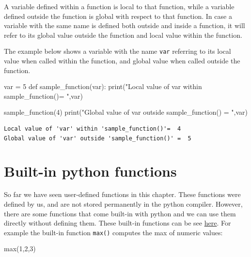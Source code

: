 \documentclass[
  letterpaper,
  DIV=11,
  numbers=noendperiod]{scrreprt}
\newenvironment{Shaded}{\begin{snugshade}}{\end{snugshade}}
\newcommand{\BuiltInTok}[1]{\textcolor[rgb]{0.00,0.23,0.31}{#1}}
\newcommand{\DecValTok}[1]{\textcolor[rgb]{0.68,0.00,0.00}{#1}}
\newcommand{\KeywordTok}[1]{\textcolor[rgb]{0.00,0.23,0.31}{#1}}
\newcommand{\NormalTok}[1]{\textcolor[rgb]{0.00,0.23,0.31}{#1}}
\newcommand{\OperatorTok}[1]{\textcolor[rgb]{0.37,0.37,0.37}{#1}}
\newcommand{\StringTok}[1]{\textcolor[rgb]{0.13,0.47,0.30}{#1}}
\begin{document}
A variable defined within a function is local to that function, while a
variable defined outside the function is global with respect to that
function. In case a variable with the same name is defined both outside
and inside a function, it will refer to its global value outside the
function and local value within the function.

The example below shows a variable with the name \texttt{var} referring
to its local value when called within the function, and global value
when called outside the function.

\begin{Shaded}
\begin{Highlighting}[]
\NormalTok{var }\OperatorTok{=} \DecValTok{5}
\KeywordTok{def}\NormalTok{ sample\_function(var):    }
    \BuiltInTok{print}\NormalTok{(}\StringTok{"Local value of \textquotesingle{}var\textquotesingle{} within \textquotesingle{}sample\_function()\textquotesingle{}= "}\NormalTok{,var)}

\NormalTok{sample\_function(}\DecValTok{4}\NormalTok{)}
\BuiltInTok{print}\NormalTok{(}\StringTok{"Global value of \textquotesingle{}var\textquotesingle{} outside \textquotesingle{}sample\_function()\textquotesingle{} = "}\NormalTok{,var)}
\end{Highlighting}
\end{Shaded}

\begin{verbatim}
Local value of 'var' within 'sample_function()'=  4
Global value of 'var' outside 'sample_function()' =  5
\end{verbatim}

\hypertarget{built-in-python-functions}{%
\section{Built-in python functions}\label{built-in-python-functions}}

So far we have seen user-defined functions in this chapter. These
functions were defined by us, and are not stored permanently in the
python compiler. However, there are some functions that come built-in
with python and we can use them directly without defining them. These
built-in functions can be see
\href{https://docs.python.org/3/library/functions.html}{here}. For
example the built-in function \texttt{max()} computes the max of numeric
values:

\begin{Shaded}
\begin{Highlighting}[]
\BuiltInTok{max}\NormalTok{(}\DecValTok{1}\NormalTok{,}\DecValTok{2}\NormalTok{,}\DecValTok{3}\NormalTok{)}
\end{Highlighting}
\end{Shaded}
\end{document}
